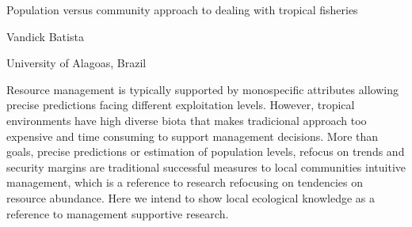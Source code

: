 \documentclass[a4paper]{article}
\begin{document}

\Large
\begin{center}
Population versus community approach to dealing with tropical fisheries\\ 

\hspace{10pt}

\large
Vandick Batista

\hspace{10pt}

\small  
University of Alagoas, Brazil\\

\end{center}

\hspace{10pt}

\normalsize

Resource management is typically supported by monospecific attributes allowing precise predictions facing different exploitation levels. However, tropical environments have high diverse biota that makes tradicional approach too expensive and time consuming to support management decisions. More than goals, precise predictions or estimation of population levels, refocus on trends and security margins are traditional successful measures to local communities intuitive management, which is a reference to research refocusing on tendencies on resource abundance. Here we intend to show local ecological knowledge as a reference to management supportive research.
\end{document}
